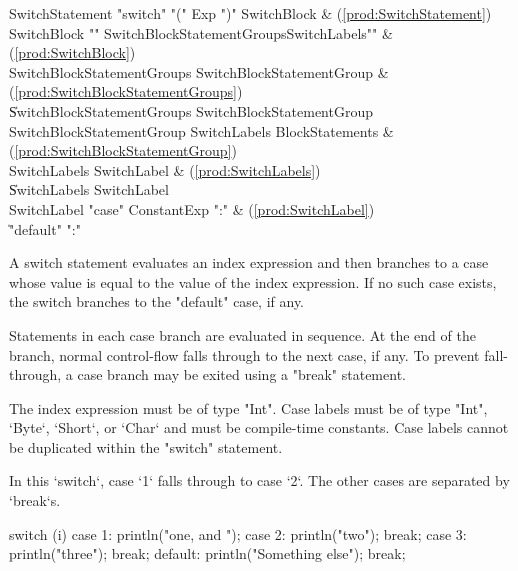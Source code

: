 \begin{bbgrammar}
     SwitchStatement \: \xcd"switch" \xcd"(" Exp \xcd")" SwitchBlock & (\ref{prod:SwitchStatement}) \\
         SwitchBlock \: \xcd"{" SwitchBlockStatementGroups\opt SwitchLabels\opt \xcd"}" & (\ref{prod:SwitchBlock}) \\
SwitchBlockStatementGroups \: SwitchBlockStatementGroup & (\ref{prod:SwitchBlockStatementGroups}) \\
                    \| SwitchBlockStatementGroups SwitchBlockStatementGroup \\
SwitchBlockStatementGroup \: SwitchLabels BlockStatements & (\ref{prod:SwitchBlockStatementGroup}) \\
        SwitchLabels \: SwitchLabel & (\ref{prod:SwitchLabels}) \\
                    \| SwitchLabels SwitchLabel \\
         SwitchLabel \: \xcd"case" ConstantExp \xcd":" & (\ref{prod:SwitchLabel}) \\
                    \| \xcd"default" \xcd":" \\
\end{bbgrammar}

A switch statement evaluates an index expression and then branches to
a case whose value is equal to the value of the index expression.
If no such case exists, the switch branches to the 
\xcd"default" case, if any.

Statements in each case branch are evaluated in sequence.  At the
end of the branch, normal control-flow falls through to the next case, if
any.  To prevent fall-through, a case branch may be exited using
a \xcd"break" statement.

The index expression must be of type \xcd"Int".
Case labels must be of type \xcd"Int", \xcd`Byte`, \xcd`Short`, or \xcd`Char`
and must be compile-time 
constants.  Case labels cannot be duplicated within the
\xcd"switch" statement.

\begin{ex}
In this \xcd`switch`, case \xcd`1` falls through to case \xcd`2`.  The
other cases are separated by \xcd`break`s.
\begin{xten}
switch (i) {
  case 1: println("one, and ");
  case 2: println("two"); 
          break;
  case 3: println("three");
          break;
  default: println("Something else");
           break;
}
\end{xten}
\end{ex}

